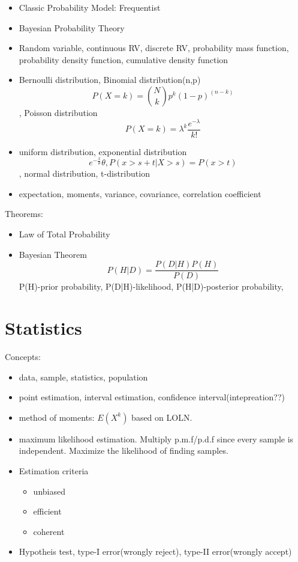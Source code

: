 \documentclass[11pt, openany]{book}              %
\begin{document}
\begin{itemize}
    \item Classic Probability Model: Frequentist 
    \item Bayesian Probability Theory 
    \item Random variable, continuous RV, discrete RV, probability mass function, probability density function, cumulative density function
    \item Bernoulli distribution, Binomial distribution(n,p)$$P(X=k) = {N\choose k} p^k (1-p)^{(n-k)}$$, Poisson distribution $$P(X=k) = \lambda^k \frac{e^{-\lambda}}{k!}$$
    \item uniform distribution, exponential distribution $$e^{-\frac{x}{\theta}}\theta, P(x>s+t|X>s) = P(x>t)$$, normal distribution, t-distribution
    \item expectation, moments, variance, covariance, correlation coefficient
\end{itemize}


Theorems:

\begin{itemize}
    \item Law of Total Probability
    \item Bayesian Theorem $$P(H|D) = \frac{P(D|H) P(H)}{P(D)}$$ P(H)-prior probability, P(D|H)-likelihood, P(H|D)-posterior probability,
\end{itemize}

\section{Statistics}

Concepts:

\begin{itemize}
    \item data, sample, statistics, population
    \item point estimation, interval estimation, confidence interval(intepreation??)
    \item method of moments: $E(X^k)$ based on LOLN.
    \item maximum likelihood estimation. Multiply p.m.f/p.d.f since every sample is independent. Maximize the likelihood of finding samples. 
    \item Estimation criteria
   		\begin{itemize}
   		 \item unbiased
   		 \item efficient
   		 \item coherent
   		\end{itemize}
   	\item Hypotheis test, type-I error(wrongly reject), type-II error(wrongly accept)
\end{itemize}
\end{document}

